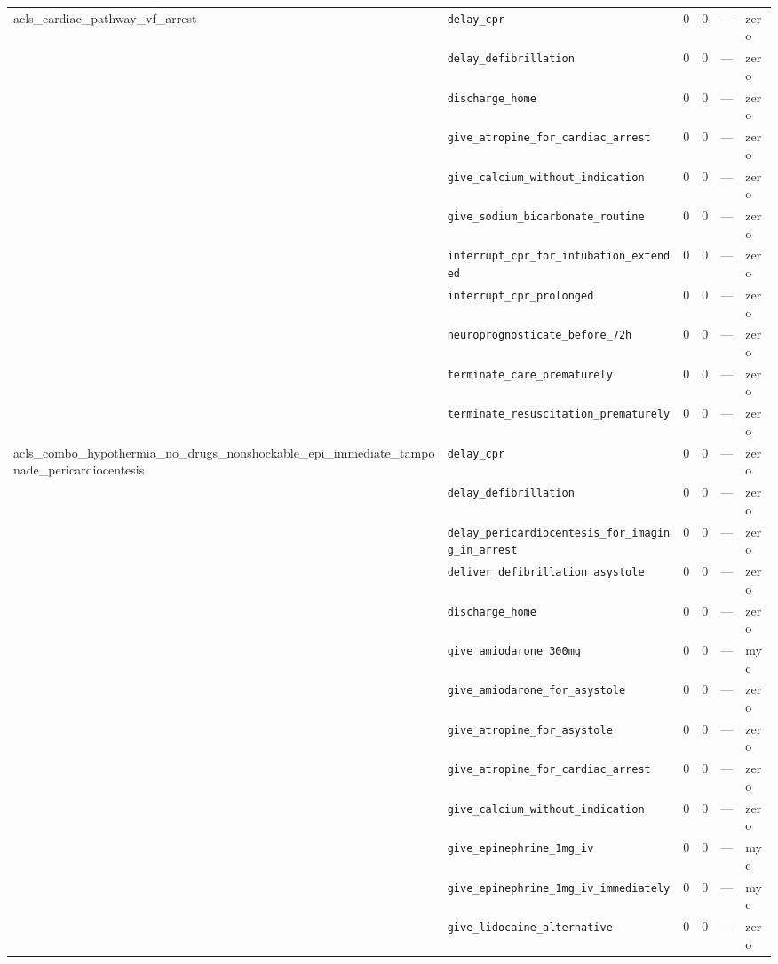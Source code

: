 \begin{table}[ht]
\begin{tabular}{llrrrl}
\midrule
acls\_cardiac\_pathway\_vf\_arrest & \texttt{delay\_cpr} & 0 & 0 & — & zero \\
 & \texttt{delay\_defibrillation} & 0 & 0 & — & zero \\
 & \texttt{discharge\_home} & 0 & 0 & — & zero \\
 & \texttt{give\_atropine\_for\_cardiac\_arrest} & 0 & 0 & — & zero \\
 & \texttt{give\_calcium\_without\_indication} & 0 & 0 & — & zero \\
 & \texttt{give\_sodium\_bicarbonate\_routine} & 0 & 0 & — & zero \\
 & \texttt{interrupt\_cpr\_for\_intubation\_extended} & 0 & 0 & — & zero \\
 & \texttt{interrupt\_cpr\_prolonged} & 0 & 0 & — & zero \\
 & \texttt{neuroprognosticate\_before\_72h} & 0 & 0 & — & zero \\
 & \texttt{terminate\_care\_prematurely} & 0 & 0 & — & zero \\
 & \texttt{terminate\_resuscitation\_prematurely} & 0 & 0 & — & zero \\
\midrule
acls\_combo\_hypothermia\_no\_drugs\_nonshockable\_epi\_immediate\_tamponade\_pericardiocentesis & \texttt{delay\_cpr} & 0 & 0 & — & zero \\
 & \texttt{delay\_defibrillation} & 0 & 0 & — & zero \\
 & \texttt{delay\_pericardiocentesis\_for\_imaging\_in\_arrest} & 0 & 0 & — & zero \\
 & \texttt{deliver\_defibrillation\_asystole} & 0 & 0 & — & zero \\
 & \texttt{discharge\_home} & 0 & 0 & — & zero \\
 & \texttt{give\_amiodarone\_300mg} & 0 & 0 & — & myc \\
 & \texttt{give\_amiodarone\_for\_asystole} & 0 & 0 & — & zero \\
 & \texttt{give\_atropine\_for\_asystole} & 0 & 0 & — & zero \\
 & \texttt{give\_atropine\_for\_cardiac\_arrest} & 0 & 0 & — & zero \\
 & \texttt{give\_calcium\_without\_indication} & 0 & 0 & — & zero \\
 & \texttt{give\_epinephrine\_1mg\_iv} & 0 & 0 & — & myc \\
 & \texttt{give\_epinephrine\_1mg\_iv\_immediately} & 0 & 0 & — & myc \\
 & \texttt{give\_lidocaine\_alternative} & 0 & 0 & — & zero \\

\end{tabular}
\end{table}
